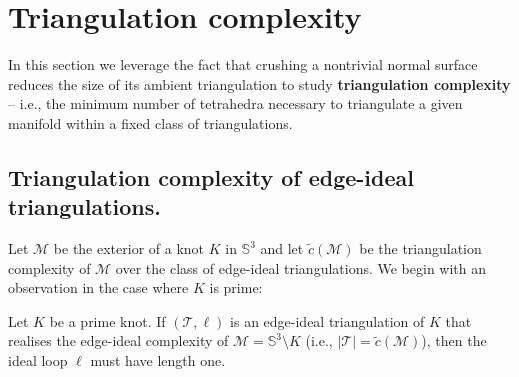 \documentclass[a4paper,UKenglish,cleveref, autoref, thm-restate]{lipics-v2021}
\newcommand{\tri}{\mathcal{T}}
\newcommand{\manifold}{\mathcal{M}}
\begin{document}
\section{Triangulation complexity}\label{sec:further}

In this section we leverage the fact that crushing a nontrivial normal surface reduces the size of its ambient triangulation to study \textbf{triangulation complexity} --
i.e., the minimum number of tetrahedra necessary to triangulate a given manifold within a fixed class of triangulations.

\subsection{Triangulation complexity of edge-ideal triangulations.}

Let $\mathcal{M}$ be the exterior of a knot $K$ in $\mathbb{S}^3$ and let $\tilde{c}(\mathcal{M})$ be the triangulation complexity of $\mathcal{M}$ over the class of edge-ideal triangulations.
We begin with an observation in the case where $K$ is prime:

\begin{lemma}\label{lem:minEdgeIdealPrime}
Let $K$ be a prime knot. If $(\tri,\ell)$ is an edge-ideal triangulation of $K$ that
realises the edge-ideal complexity of $\manifold = \mathbb{S}^3\setminus K$ (i.e.,
$|\tri| = \tilde{c}(\mathcal{M})$), then the ideal loop $\ell$ must have length one.
\end{lemma}
\end{document}
